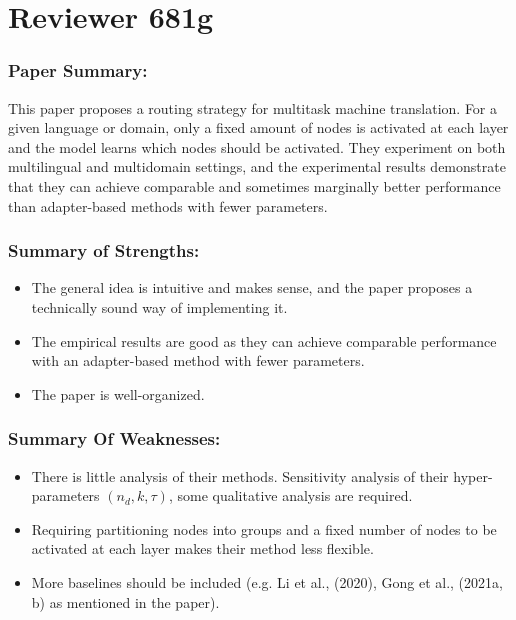 \documentclass[12pt,times,a4paper,twoside]{article}
\theoremstyle{definition}
\begin{document}
\section*{Reviewer 681g}

\subsubsection*{Paper Summary:}

This paper proposes a routing strategy for multitask machine translation. For a given language or domain, only a fixed amount of nodes is activated at each layer and the model learns which nodes should be activated. They experiment on both multilingual and multidomain settings, and the experimental results demonstrate that they can achieve comparable and sometimes marginally better performance than adapter-based methods with fewer parameters.

\subsubsection*{Summary of Strengths:}
\begin{itemize}
\item The general idea is intuitive and makes sense, and the paper proposes a technically sound way of implementing it.
\item The empirical results are good as they can achieve comparable performance with an adapter-based method with fewer parameters.
\item The paper is well-organized.
\end{itemize}

\subsubsection*{Summary Of Weaknesses:}

\begin{itemize}
\item There is little analysis of their methods. Sensitivity analysis of their hyper-parameters $(n_d,k,\tau)$, some qualitative analysis are required.
\item Requiring partitioning nodes into groups and a fixed number of nodes to be activated at each layer makes their method less flexible.
\item More baselines should be included (e.g. Li et al., (2020), Gong et al., (2021a, b) as mentioned in the paper).
\end{itemize}
\end{document}
